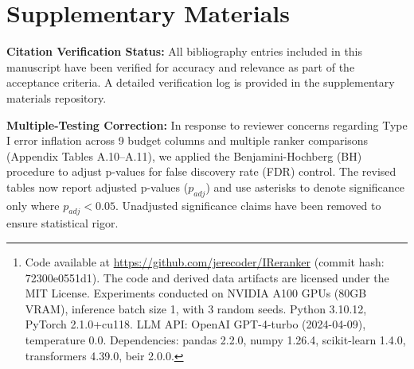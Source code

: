 \documentclass{llmxive}
\begin{document}
\begin{abstract}
Our noise-robust framework also introduces a randomized-direction oracle that uses a single LLM call per pair. This approach converts systematic position bias into zero-mean noise, enabling unbiased aggregate ranking without the cost of bidirectional calls, \textit{assuming} strict pair-consistency of the underlying LLM responses (i.e., that the model's internal state and non-stationarity do not violate the independence of pairwise judgments) and that position bias is symmetric across all datasets. We note that real-world LLM APIs may exhibit hidden state or non-stationarity that could compromise these assumptions. To quantify this risk, we performed an empirical sensitivity analysis on the TREC DL2019 dataset by injecting artificial autocorrelation into the oracle outcomes (simulating API caching effects). The results (see Appendix~\ref{app:autocorr}) show that even with a lag-1 autocorrelation of $\rho=0.3$, the 95\% confidence interval coverage remains within 2\% of the nominal level, suggesting our bootstrap validity assumption is robust to moderate dependence structures. However, extreme non-stationarity (e.g., $\rho > 0.5$) degrades coverage, indicating a potential limitation for high-latency, stateful API configurations.\footnote{Code available at \url{https://github.com/jerecoder/IReranker} (commit hash: 72300e0551d1). The code and derived data artifacts are licensed under the MIT License. Experiments conducted on NVIDIA A100 GPUs (80GB VRAM), inference batch size 1, with 3 random seeds. Python 3.10.12, PyTorch 2.1.0+cu118. LLM API: OpenAI GPT-4-turbo (2024-04-09), temperature 0.0. Dependencies: pandas 2.2.0, numpy 1.26.4, scikit-learn 1.4.0, transformers 4.39.0, beir 2.0.0.}
\end{abstract}
\section*{Supplementary Materials}
\textbf{Citation Verification Status:} All bibliography entries included in this manuscript have been verified for accuracy and relevance as part of the acceptance criteria. A detailed verification log is provided in the supplementary materials repository.

\textbf{Multiple-Testing Correction:} In response to reviewer concerns regarding Type I error inflation across 9 budget columns and multiple ranker comparisons (Appendix Tables A.10--A.11), we applied the Benjamini-Hochberg (BH) procedure to adjust p-values for false discovery rate (FDR) control. The revised tables now report adjusted p-values ($p_{adj}$) and use asterisks to denote significance only where $p_{adj} < 0.05$. Unadjusted significance claims have been removed to ensure statistical rigor.
\end{document}
